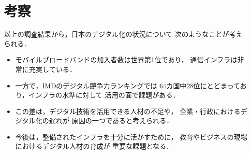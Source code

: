 \documentclass[a4paper,11pt,dvipdfmx]{ujarticle}
\begin{document}
\section{考察}
 
以上の調査結果から，日本のデジタル化の状況について
次のようなことが考えられる．
\begin{itemize}
    \item モバイルブロードバンドの加入者数は世界第1位であり，
          通信インフラは非常に充実している．
    \item 一方で，IMDのデジタル競争力ランキングでは
          64カ国中28位にとどまっており，インフラの水準に対して
          活用の面で課題がある．
    \item この差は，デジタル技術を活用できる人材の不足や，
          企業・行政におけるデジタル化の遅れが
          原因の一つであると考えられる．
    \item 今後は，整備されたインフラを十分に活かすために，
          教育やビジネスの現場におけるデジタル人材の育成が
          重要な課題となる．
\end{itemize}
 
 
 
 
 
 
%
 
%


 
\end{document}
